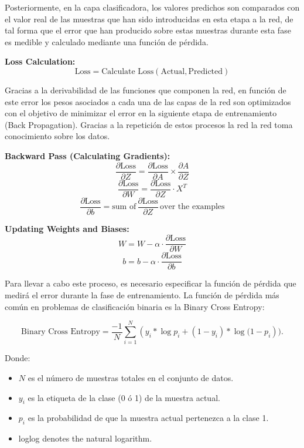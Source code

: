 \documentclass{uathesis-es}
\begin{document}
Posteriormente, en la capa clasificadora, los valores predichos son comparados con el valor real de las muestras que han sido introducidas en esta etapa a la red, de tal forma que el error que han producido sobre estas muestras durante esta fase es medible y calculado mediante una función de pérdida.

\textbf{Loss Calculation:}
\[ \text{Loss} = \text{Calculate Loss}(\text{Actual}, \text{Predicted}) \]

Gracias a la derivabilidad de las funciones que componen la red, en función de este error los pesos asociados a cada una de las capas de la red son optimizados con el objetivo de minimizar el error en la siguiente etapa de entrenamiento (Back Propagation). Gracias a la repetición de estos procesos la red la red toma conocimiento sobre los datos.

\textbf{Backward Pass (Calculating Gradients):}
\[ \frac{\partial \text{Loss}}{\partial Z} = \frac{\partial \text{Loss}}{\partial A} \times \frac{\partial A}{\partial Z} \]
\[ \frac{\partial \text{Loss}}{\partial W} = \frac{\partial \text{Loss}}{\partial Z} \cdot X^T \]
\[ \frac{\partial \text{Loss}}{\partial b} = \text{sum of} \, \frac{\partial \text{Loss}}{\partial Z} \, \text{over the examples} \]

\textbf{Updating Weights and Biases:}
\[ W = W - \alpha \cdot \frac{\partial \text{Loss}}{\partial W} \]
\[ b = b - \alpha \cdot \frac{\partial \text{Loss}}{\partial b} \]

Para llevar a cabo este proceso, es necesario especificar la función de pérdida que medirá el error durante la fase de entrenamiento. La función de pérdida más común en problemas de clasificación binaria es la Binary Cross Entropy:

$$\text{Binary Cross Entropy} = \frac{-1}{N} \sum_{i=1}^{N} (y_{i}*\log{p_{i}}+ (1 - y_{i})*\log{(1-p_{i}})).$$

Donde:

\begin{itemize}
    \item $N$ es el número de muestras totales en el conjunto de datos.
    \item $y_i$ es la etiqueta de la clase (0 ó 1) de la muestra actual.
    \item $p_i$ es la probabilidad de que la muestra actual pertenezca a la clase 1.
    \item log⁡log denotes the natural logarithm.
\end{itemize}
\end{document}
